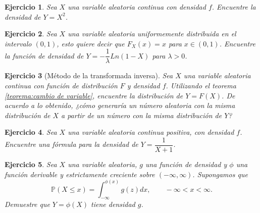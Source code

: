 \documentclass[11pt]{report}
\theoremstyle{break}
\newtheorem{ejercicio}{Ejercicio}[chapter]
\theoremstyle{break}
\begin{document}
\begin{ejercicio}
Sea $X$ una variable aleatoria continua con densidad $f$. Encuentre la densidad de $Y = X^2$.
\end{ejercicio}

\begin{ejercicio}
Sea $X$ una variable aleatoria uniformemente distribuida en el intervalo $(0,1)$, esto quiere decir que $F_X(x) = x$ para $x \in (0,1)$. Encuentre la función de densidad de $Y = - \dfrac{1}{\lambda} Ln (1 - X)$ para $\lambda > 0$.
\end{ejercicio}

\begin{ejercicio}[Método de la transformada inversa]
Sea $X$ una variable aleatoria continua con función de distribución $F$ y densidad $f$. Utilizando el teorema \ref{teorema:cambio de variable}, encuentre la distribución de $Y = F(X)$.
De acuerdo a lo obtenido, ¿cómo generaría un número aleatoria con la misma distribución de $X$ a partir de un número con la misma distribución de $Y$?
\end{ejercicio}

\begin{ejercicio}
Sea $X$ una variable aleatoria continua positiva, con densidad $f$. Encuentre una fórmula para la densidad de $Y = \dfrac{1}{X + 1}$.
\end{ejercicio}

\begin{ejercicio}
Sea $X$ una variable aleatoria, $g$ una función de densidad y $\phi$ una función derivable y estrictamente creciente sobre $(-\infty, \infty)$. Supongamos que
$$
\mathbb{P}(X \leq x) = \int_{-\infty}^{\phi(x)} g(z)dx, \qquad -\infty < x <\infty.
$$
Demuestre que $Y = \phi(X)$ tiene densidad $g$.
\end{ejercicio}
\end{document}
